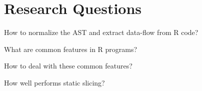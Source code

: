 \section[RQs]{Research Questions}
{\def\G{\only<7->{\color{lightgray}}}
\begin{frame}[c]{\insertsection}
   \begin{description}
      \itemsep12pt
      \item<2->[RQ1:] %
      How to normalize the AST and extract data-flow from R code?
      \item<3->[RQ2:] What are common features in R programs?
      \item<4->[\G RQ3:] \G How to deal with these common features?
      \item<5->[\G RQ4:] \G How well performs static slicing?
   \end{description}
\end{frame}
}